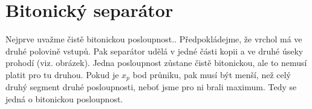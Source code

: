 \documentclass[a4paper]{article}
\begin{document}
\renewcommand{\headrulewidth}{0pt} %
\thispagestyle{fancy} %
{}

\section*{Bitonický separátor}
Nejprve uvažme čistě bitonickou posloupnost.. Předpokládejme, že vrchol má ve druhé polovině vstupů. Pak separátor udělá v jedné části kopii a ve druhé úseky prohodí (viz. obrázek). Jedna posloupnost zůstane čistě bitonickou, ale to nemusí platit pro tu druhou. Pokud je $x_p$ bod průniku, pak musí být menší, než celý druhý segment druhé posloupnosti, neboť jsme pro ni brali maximum. Tedy se jedná o bitonickou posloupnost.
\end{document}
